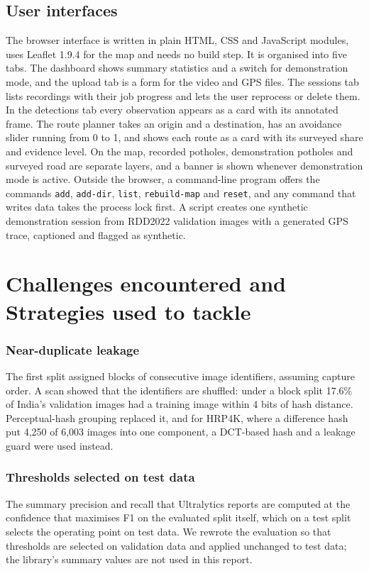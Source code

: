 \subsection{User interfaces}
The browser interface is written in plain HTML, CSS and JavaScript modules, uses Leaflet 1.9.4 for the map and needs no build step. It is organised into five tabs. The dashboard shows summary statistics and a switch for demonstration mode, and the upload tab is a form for the video and GPS files. The sessions tab lists recordings with their job progress and lets the user reprocess or delete them. In the detections tab every observation appears as a card with its annotated frame. The route planner takes an origin and a destination, has an avoidance slider running from 0 to 1, and shows each route as a card with its surveyed share and evidence level. On the map, recorded potholes, demonstration potholes and surveyed road are separate layers, and a banner is shown whenever demonstration mode is active. Outside the browser, a command-line program offers the commands \texttt{add}, \texttt{add-dir}, \texttt{list}, \texttt{rebuild-map} and \texttt{reset}, and any command that writes data takes the process lock first. A script creates one synthetic demonstration session from RDD2022 validation images with a generated GPS trace, captioned and flagged as synthetic.

\section{Challenges encountered and Strategies used to tackle}\label{sec:ch5-challenges}

\subsubsection*{Near-duplicate leakage}
The first split assigned blocks of consecutive image identifiers, assuming capture order. A scan showed that the identifiers are shuffled: under a block split 17.6\% of India's validation images had a training image within 4 bits of hash distance. Perceptual-hash grouping replaced it, and for HRP4K, where a difference hash put 4,250 of 6,003 images into one component, a DCT-based hash and a leakage guard were used instead.

\subsubsection*{Thresholds selected on test data}
The summary precision and recall that Ultralytics reports are computed at the confidence that maximises F1 on the evaluated split itself, which on a test split selects the operating point on test data. We rewrote the evaluation so that thresholds are selected on validation data and applied unchanged to test data; the library's summary values are not used in this report.

